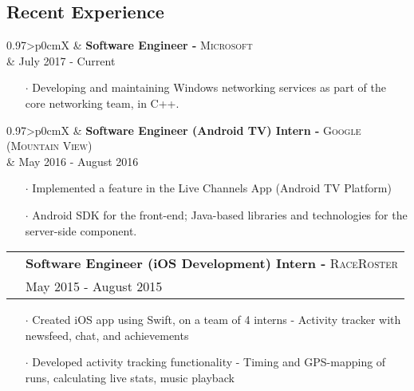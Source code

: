 \documentclass[letterpaper, oneside, final]{scrartcl} %
\newcommand{\gray}{\rowcolor[gray]{.90}} %
\begin{document}
\begin{center}
\vspace{-3mm}

\section{Recent Experience}

\renewcommand{\arraystretch}{1.3}

\begin{tabularx}{0.97\linewidth}{>{\raggedleft\scshape}p{0cm}X}
\gray & \textbf{Software Engineer -} \textsc{Microsoft}\\
\gray & {July 2017 - Current}\\
\end{tabularx}
\vspace{-0.1cm}
\begin{itemize} \itemsep-0.2cm
\item[$\cdot$]  Developing and maintaining Windows networking services as part of the core networking team, in C++.
\end{itemize}

\vspace{-0.05cm}

\begin{tabularx}{0.97\linewidth}{>{\raggedleft\scshape}p{0cm}X}
\gray & \textbf{Software Engineer (Android TV) Intern -} \textsc{Google (Mountain View)}\\
\gray & {May 2016 - August 2016}\\
\end{tabularx}
\vspace{-0.1cm}
\begin{itemize} \itemsep-0.2cm
\item[$\cdot$] Implemented a feature in the Live Channels App (Android TV Platform)
\item[$\cdot$] Android SDK for the front-end; Java-based libraries and technologies for the server-side component.
\end{itemize}

\vspace{-0.05cm}

\begin{tabularx}{0.97\linewidth}{>{\raggedleft\scshape}p{0cm}X}
\gray & \textbf{Software Engineer (iOS Development) Intern -} \textsc{RaceRoster}\\
\gray & {May 2015 - August 2015}\\
\end{tabularx}
\vspace{-0.1cm}
\begin{itemize} \itemsep-0.2cm
\item[$\cdot$] Created iOS app using Swift, on a team of 4 interns - Activity tracker with newsfeed, chat, and achievements \\
\item[$\cdot$] Developed activity tracking functionality - Timing and GPS-mapping of runs, calculating live stats, music playback
\end{itemize}


\end{center}
\end{document}
